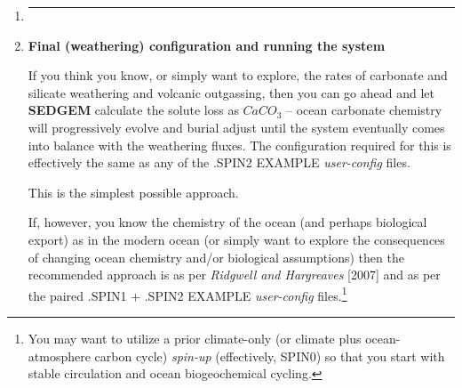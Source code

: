 \begin{enumerate}[noitemsep]
\vspace{2mm}
\textbf{The simplest parameter set for implementing bioturbation is\footnote{post commit \texttt{d569cd6}}}: 
\vspace{-1mm}\small\begin{verbatim}
# bioturbation
# NOTE: turn ON bioturbation to capture carbonate compensation dynamics
sg_ctrl_sed_bioturb=.TRUE.
# scale (maximum) surface biodiffusion rate
sg_par_sed_mix_k_sur_max=0.15
\end{verbatim}\normalsize\vspace{-1mm}
with all other parameters requiring their default values and hence need not be explicitly included in the \textit{user-config}.

\item []\noindent\rule{4cm}{0.5pt}
\vspace{1mm}

\newpage
%
\vspace{2mm}
\item \textbf{Final (weathering) configuration and running the system}
\vspace{1mm}

If you think you know, or simply want to explore, the rates of carbonate and silicate weathering and volcanic outgassing, then you can go ahead and let \textbf{SEDGEM} calculate the solute loss as \(CaCO_{3}\) -- ocean carbonate chemistry  will progressively evolve and burial adjust until the system eventually comes into balance with the weathering fluxes. The configuration required for this is effectively the same as any of the \textsf{\footnotesize *.SPIN2} EXAMPLE \textit{user-config} files.

This is the simplest possible approach.

\vspace{1mm}
If, however, you know the chemistry of the ocean (and perhaps biological export) as in the modern ocean (or simply want to explore the consequences of changing ocean chemistry and/or biological assumptions) then the recommended approach is as per \textit{Ridgwell and Hargreaves} [2007] and as per the  paired \textsf{\footnotesize *.SPIN1} + \textsf{\footnotesize *.SPIN2} EXAMPLE \textit{user-config} files.\footnote{You may want to utilize a prior climate-only (or climate plus ocean-atmosphere carbon cycle) \textit{spin-up} (effectively, SPIN0) so that you start with stable circulation and ocean biogeochemical cycling.} 


\end{enumerate}
